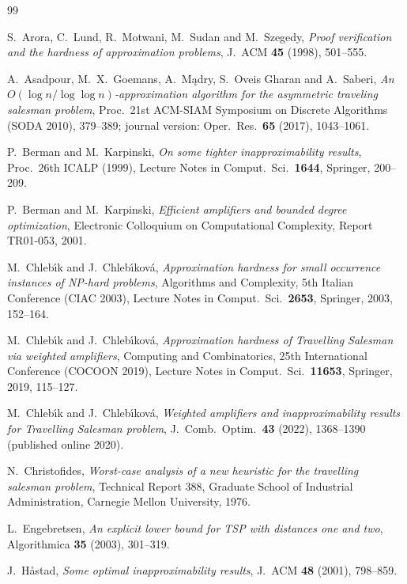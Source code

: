\documentclass[11pt]{amsart}
\theoremstyle{definition}
\theoremstyle{remark}
\numberwithin{equation}{section}
\begin{document}
\begin{thebibliography}{99}

S.~Arora, C.~Lund, R.~Motwani, M.~Sudan and M.~Szegedy,
\emph{Proof verification and the hardness of approximation problems},
J.~ACM \textbf{45} (1998), 501--555.

A.~Asadpour, M.~X.~Goemans, A.~M\k{a}dry, S.~Oveis Gharan and A.~Saberi,
\emph{An {$O(\log n/\log\log n)$}-approximation algorithm for the asymmetric traveling salesman problem},
Proc.\ 21st ACM-SIAM Symposium on Discrete Algorithms (SODA 2010), 379--389;
journal version: Oper.\ Res.\ \textbf{65} (2017), 1043--1061.

P.~Berman and M.~Karpinski,
\emph{On some tighter inapproximability results},
Proc.\ 26th ICALP (1999), Lecture Notes in Comput.\ Sci.\ \textbf{1644}, Springer, 200--209.

P.~Berman and M.~Karpinski,
\emph{Efficient amplifiers and bounded degree optimization},
Electronic Colloquium on Computational Complexity, Report TR01-053, 2001.

M.~Chleb\'{\i}k and J.~Chleb\'{\i}kov\'a,
\emph{Approximation hardness for small occurrence instances of {NP}-hard problems},
Algorithms and Complexity, 5th Italian Conference (CIAC 2003), Lecture Notes in Comput.\ Sci.\ \textbf{2653}, Springer, 2003, 152--164.

M.~Chleb\'{\i}k and J.~Chleb\'{\i}kov\'a,
\emph{Approximation hardness of {T}ravelling {S}alesman via weighted amplifiers},
Computing and Combinatorics, 25th International Conference (COCOON 2019), Lecture Notes in Comput.\ Sci.\ \textbf{11653}, Springer, 2019, 115--127.

M.~Chleb\'{\i}k and J.~Chleb\'{\i}kov\'a,
\emph{Weighted amplifiers and inapproximability results for {T}ravelling {S}alesman problem},
J.~Comb.\ Optim.\ \textbf{43} (2022), 1368--1390 (published online 2020).

N.~Christofides,
\emph{Worst-case analysis of a new heuristic for the travelling salesman problem},
Technical Report 388, Graduate School of Industrial Administration, Carnegie Mellon University, 1976.

L.~Engebretsen,
\emph{An explicit lower bound for {TSP} with distances one and two},
Algorithmica \textbf{35} (2003), 301--319.

J.~H{\aa}stad,
\emph{Some optimal inapproximability results},
J.~ACM \textbf{48} (2001), 798--859.


\end{thebibliography}
\end{document}
